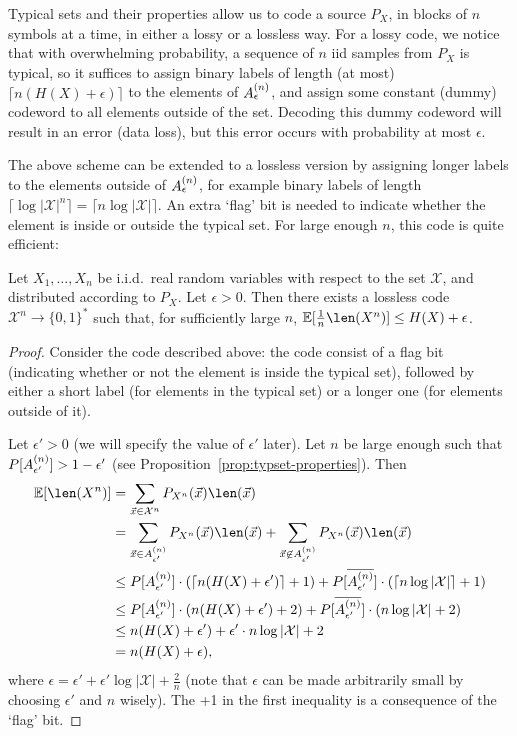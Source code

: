Typical sets and their properties allow us to code a source $P_X$, in blocks of $n$ symbols at a time, in either a lossy or a lossless way. For a lossy code, we notice that with overwhelming probability, a sequence of $n$ iid samples from $P_X$ is typical, so it suffices to assign binary labels of length (at most) $\lceil n (H(X) + \epsilon)\rceil$ to the elements of $A_{\epsilon}^{(n)}$, and assign some constant (dummy) codeword to all elements outside of the set. Decoding this dummy codeword will result in an error (data loss), but this error occurs with probability at most $\epsilon$.

The above scheme can be extended to a lossless version by assigning longer labels to the elements outside of $A_{\epsilon}^{(n)}$, for example binary labels of length $\lceil \log |\mathcal{X}|^n\rceil = \lceil n \log |\mathcal{X}|\rceil$. An extra `flag' bit is needed to indicate whether the element is inside or outside the typical set. For large enough $n$, this code is quite efficient:
\begin{theorem}
Let $X_1, \ldots, X_n$ be i.i.d.\ real random variables with respect to the set $\mathcal{X}$, and distributed according to $P_X$. Let $\epsilon > 0$. Then there exists a lossless code $\mathcal{X}^n \to \{0,1\}^*$ such that, for sufficiently large $n$, $\mathbb{E}[\frac{1}{n} \len(X^n)] \leq H(X) + \epsilon$.
\end{theorem}
\begin{proof}
Consider the code described above: the code consist of a flag bit (indicating whether or not the element is inside the typical set), followed by either a short label (for elements in the typical set) or a longer one (for elements outside of it).

Let $\epsilon' > 0$ (we will specify the value of $\epsilon'$ later). Let $n$ be large enough such that $P[A_{\epsilon'}^{(n)}] > 1 - \epsilon'$ (see Proposition~\ref{prop:typset-properties}). Then
\begin{align}
\mathbb{E}[\len(X^n)] &= \sum_{\vec{x} \in \mathcal{X}^n} P_{X^n}(\vec{x}) \len(\vec{x})\nonumber\\
&= \sum_{\vec{x} \in \typsetp} P_{X^n}(\vec{x}) \len(\vec{x}) + \sum_{\vec{x} \not\in \typsetp} P_{X^n}(\vec{x}) \len(\vec{x})\nonumber\\
&\leq P[\typsetp] \cdot (\lceil n (H(X) + \epsilon') \rceil + 1) + P[\overline{\typsetp}] \cdot (\lceil n \log |\mathcal{X}| \rceil + 1)\nonumber\\
&\leq P[\typsetp] \cdot (n (H(X) + \epsilon') + 2) + P[\overline{\typsetp}] \cdot (n \log |\mathcal{X}| + 2)\nonumber\\
&\leq n ( H(X) + \epsilon') + \epsilon' \cdot n \log |\mathcal{X}| + 2\nonumber\\
&= n(H(X) + \epsilon),
\end{align}
where $\epsilon = \epsilon' + \epsilon' \log |\mathcal{X}| + \frac{2}{n}$ (note that $\epsilon$ can be made arbitrarily small by choosing $\epsilon'$ and $n$ wisely). The +1 in the first inequality is a consequence of the `flag' bit.
\end{proof}
